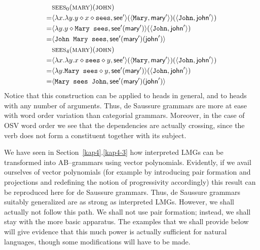 \begin{align}
 & \mbox{\sc sees}_0(\mbox{\sc mary})(\mbox{\sc john}) \\\notag
 = & \auf \lambda x.\lambda y.
    y \oconc x \oconc \mbox{\tt sees}, \mbox{\sf see}'\zu
(\auf \mbox{\tt Mary}, \mbox{\sf mary}'\zu)
(\auf \mbox{\tt John}, \mbox{\sf john}'\zu) \\\notag
 = & \auf \lambda y. y \oconc \mbox{\tt Mary sees},
    \mbox{\sf see}'(\mbox{\sf mary}')\zu
    (\auf \mbox{\tt John}, \mbox{\sf john}'\zu) \\\notag
 = & \auf \mbox{\tt John Mary sees}, \mbox{\sf see}'(\mbox{\sf %
    mary}')(\mbox{\sf john}')\zu \\
 & \mbox{\sc sees}_4(\mbox{\sc mary})(\mbox{\sc john}) \\\notag
 = & \auf \lambda x.\lambda y.
    x \oconc \mbox{\tt sees} \oconc y, \mbox{\sf see}'\zu
(\auf \mbox{\tt Mary}, \mbox{\sf mary}'\zu)
(\auf \mbox{\tt John}, \mbox{\sf john}'\zu) \\\notag
 = & \auf \lambda y. \mbox{\tt Mary sees} \oconc
    y, \mbox{\sf see}'(\mbox{\sf mary}')\zu
    (\auf \mbox{\tt John}, \mbox{\sf john}'\zu) \\\notag
 = & \auf \mbox{\tt Mary sees John}, \mbox{\sf see}'(\mbox{\sf %
    mary}')(\mbox{\sf john}')\zu
\end{align}
Notice that this construction can be applied to heads in general,
and to heads with any number of arguments. Thus, de Saussure
grammars are more at ease with word order variation than categorial
grammars. Moreover, in the case of OSV word order we see that the
dependencies are actually crossing, since the verb does not form
a constituent together with its subject.

We have seen in Section~\ref{kap4}.\ref{kap4-3} how interpreted LMGs 
can be transformed into AB--grammars using vector
polynomials. Evidently, if we avail ourselves of vector polynomials
(for example by introducing pair formation and projections and
redefining the notion of progressivity accordingly) this result
can be reproduced here for de Saussure grammars. Thus, de Saussure
grammars suitably generalized are as strong as interpreted LMGs.
However, we shall actually not follow this path. We shall not use
pair formation; instead, we shall stay with the more basic apparatus.
The examples that we shall provide below will give evidence that
this much power is actually sufficient for natural languages, though
some modifications will have to be made.

